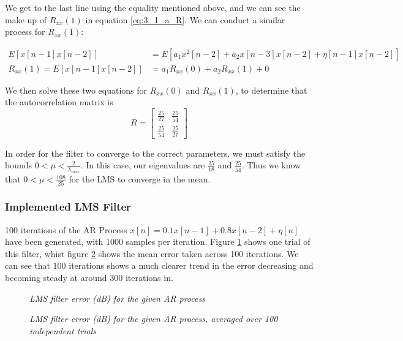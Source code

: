 \documentclass[./main.tex]{subfiles}
\begin{document}
We get to the last line using the equality mentioned above, and we can see the make up of $R_{xx}(1)$ in equation \ref{eq:3_1_a_R}. We can conduct a similar process for $R_{xx}(1)$:

\begin{subequations}
\begin{align}
E[x[n-1]x[n-2]] &= E[ a_1 x^2[n - 2] + a_2 x[n-3]x[n-2] + \eta[n-1]x[n-2] ] \\
R_{xx}(1) = E[x[n-1]x[n-2]] &= a_1 R_{xx}(0) + a_2 R_{xx}(1) + 0
\end{align}
\end{subequations}

We then solve these two equations for $ R_{xx}(0) $ and $ R_{xx}(1) $, to determine that the autocorrelation matrix is 
$$ R = \begin{bmatrix}
\frac{25}{27} & \frac{25}{54} \\[0.3em]
 \frac{25}{54} & \frac{25}{27}
\end{bmatrix}
$$

In order for the filter to converge to the correct parameters, we must satisfy the bounds $ 0 < \mu < \frac{2}{\lambda_{max}} $. In this case, our eigenvalues are $\frac{25}{18}$ and $\frac{25}{54}$. Thus we know that $ 0 < \mu < \frac{108}{25} $ for the LMS to converge in the mean.

\subsubsection{Implemented LMS Filter} \label{sec:3_1_b}
100 iterations of the AR Process $ x[n] = 0.1 x[n-1] + 0.8 x[n-2] + \eta[n] $ have been generated, with 1000 samples per iteration. Figure \ref{fig:q3_1_b_indiv} shows one trial of this filter, whist figure \ref{fig:q3_1_b} shows the mean error taken across 100 iterations. We can see that 100 iterations shows a much clearer trend in the error decreasing and becoming steady at around 300 iterations in.

\begin{figure}[h]
	\centering 
 	\resizebox{\textwidth}{!}{}
   	\caption{\textit{LMS filter error (dB) for the given AR process}}
   	\label{fig:q3_1_b_indiv}
\end{figure}


\begin{figure}[h]
	\centering 
 	\resizebox{\textwidth}{!}{}
   	\caption{\textit{LMS filter error (dB) for the given AR process, averaged over 100 independent trials}}
   	\label{fig:q3_1_b}
\end{figure}
\end{document}
